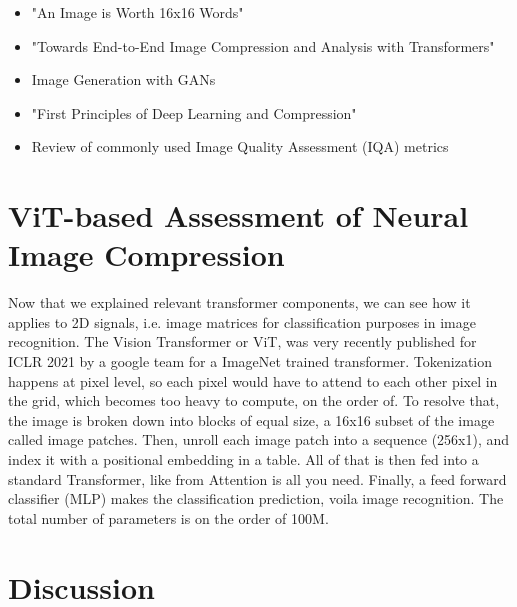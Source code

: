 \documentclass[pdftex,11pt,titlepage,twoside,openright]{report}
\begin{document}
\begin{itemize}
	\item "An Image is Worth 16x16 Words" \citep{dosovitskiy2020vit}
	\item "Towards End-to-End Image Compression and Analysis with Transformers" 
    
    \citep{Bai2022AAAI}
    \item Image Generation with GANs
	\item "First Principles of Deep Learning and Compression" \citep{Principles}
	\item Review of commonly used Image Quality Assessment (IQA) metrics
    
    \citep{Metrics}
\end{itemize}

\ThinHRule

\newpage


\chapter{ViT-based Assessment of Neural Image Compression}

Now that we explained relevant transformer components, we can see how it applies to 
2D signals, i.e. image matrices for classification purposes in image recognition.
The Vision Transformer or ViT, was very recently published for ICLR 2021 by a google 
team for a ImageNet trained transformer.
Tokenization happens at pixel level, so each pixel would have to attend to each other 
pixel in the grid, which becomes too heavy to compute, on the order of. 
To resolve that, the image is broken down into blocks of equal size, a 16x16 subset 
of the image called image patches. Then, unroll each image patch into a sequence (256x1), 
and index it with a positional embedding in a table. All of that is then fed into a 
standard Transformer, like from Attention is all you need. Finally, a feed forward 
classifier (MLP) makes the classification prediction, voila image recognition.
The total number of parameters is on the order of 100M.

\ThinHRule

\newpage


\chapter{Discussion}
\end{document}
